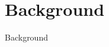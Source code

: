 \documentclass[../main.tex]{subfiles}
\begin{document}
\section{Background}
Background
\end{document}
